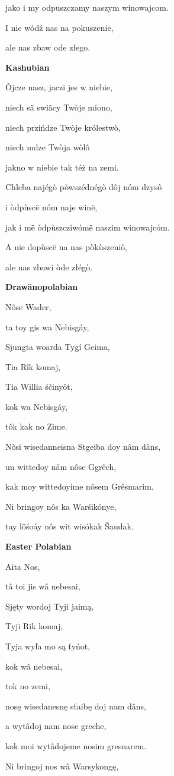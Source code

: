 jako i my odpuszczamy naszym winowajcom.

I nie wódź nas na pokuszenie,

ale nas zbaw ode złego.

\textbf{Kashubian}

Òjcze nasz, jaczi jes w niebie,

niech sã swiãcy Twòje miono,

niech przińdze Twòje królestwò,

niech mdze Twòja wòlô

jakno w niebie tak téż na zemi.

Chleba najégò pòwszédnégò dôj nóm dzysô

i òdpùscë nóm naje winë,

jak i më òdpùszcziwómë naszim winowajcóm.

A nie dopùscë na nas pòkùszeniô,

ale nas zbawi òde złégò.

\textbf{Drawänopolabian}

Nôse Wader,

ta toy gis wa Nebisgáy,

Sjungta woarda Tygí Geima,

Tia Rîk komaj,

Tia Willia śčinyôt,

kok wa Nebisgáy,

tôk kak no Zime.

Nôsi wisedanneisna Stgeiba doy nâm dâns,

un wittedoy nâm nôse Ggrêch,

kak moy wittedoyime nôsem Grêsmarim.

Ni bringoy nôs ka Warśikónye,

tay löśoáy nôs wit wisókak Šaudak.

\textbf{Easter Polabian}

Aita Nos,

tâ toi jis wâ nebesai,

Sjęty wordoj Tyji jaimą,

Tyji Rik komaj,

Tyja wyľa mo są ťyńot,

kok wâ nebesai,

tok no zemi,

nosę wisedanesnę sťaibę doj nam dâns,

a wytâdoj nam nose greche,

kok moi wytâdojeme nosim gresnarem.

Ni bringoj nos wâ Warsykongę,

